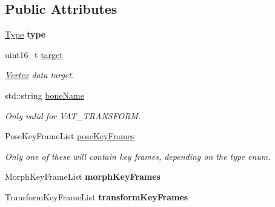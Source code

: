 \subsection*{Public Attributes}
\begin{DoxyCompactItemize}
\item 
\hypertarget{struct_assimp_1_1_ogre_1_1_vertex_animation_track_a9244d521a7680d938bc202b4c99858b7}{\hyperlink{struct_assimp_1_1_ogre_1_1_vertex_animation_track_a37591fc343c62d6911905ed23306f5e9}{Type} {\bfseries type}}\label{struct_assimp_1_1_ogre_1_1_vertex_animation_track_a9244d521a7680d938bc202b4c99858b7}

\item 
uint16\+\_\+t \hyperlink{struct_assimp_1_1_ogre_1_1_vertex_animation_track_a1d6b6d6fdedfbae0ca8ef52775ace266}{target}
\begin{DoxyCompactList}\small\item\em \hyperlink{class_assimp_1_1_vertex}{Vertex} data target. \end{DoxyCompactList}\item 
\hypertarget{struct_assimp_1_1_ogre_1_1_vertex_animation_track_a75ecca6de2e1a9523dcf1de574419796}{std\+::string \hyperlink{struct_assimp_1_1_ogre_1_1_vertex_animation_track_a75ecca6de2e1a9523dcf1de574419796}{bone\+Name}}\label{struct_assimp_1_1_ogre_1_1_vertex_animation_track_a75ecca6de2e1a9523dcf1de574419796}

\begin{DoxyCompactList}\small\item\em Only valid for V\+A\+T\+\_\+\+T\+R\+A\+N\+S\+F\+O\+R\+M. \end{DoxyCompactList}\item 
\hypertarget{struct_assimp_1_1_ogre_1_1_vertex_animation_track_a3569c61e2bde08ec3dc065a8f11f8263}{Pose\+Key\+Frame\+List \hyperlink{struct_assimp_1_1_ogre_1_1_vertex_animation_track_a3569c61e2bde08ec3dc065a8f11f8263}{pose\+Key\+Frames}}\label{struct_assimp_1_1_ogre_1_1_vertex_animation_track_a3569c61e2bde08ec3dc065a8f11f8263}

\begin{DoxyCompactList}\small\item\em Only one of these will contain key frames, depending on the type enum. \end{DoxyCompactList}\item 
\hypertarget{struct_assimp_1_1_ogre_1_1_vertex_animation_track_a524b809425ef7c6c6e63c1c0f3bed49b}{Morph\+Key\+Frame\+List {\bfseries morph\+Key\+Frames}}\label{struct_assimp_1_1_ogre_1_1_vertex_animation_track_a524b809425ef7c6c6e63c1c0f3bed49b}

\item 
\hypertarget{struct_assimp_1_1_ogre_1_1_vertex_animation_track_a87bdaba770ac50de996427b2926cb185}{Transform\+Key\+Frame\+List {\bfseries transform\+Key\+Frames}}\label{struct_assimp_1_1_ogre_1_1_vertex_animation_track_a87bdaba770ac50de996427b2926cb185}

\end{DoxyCompactItemize}


